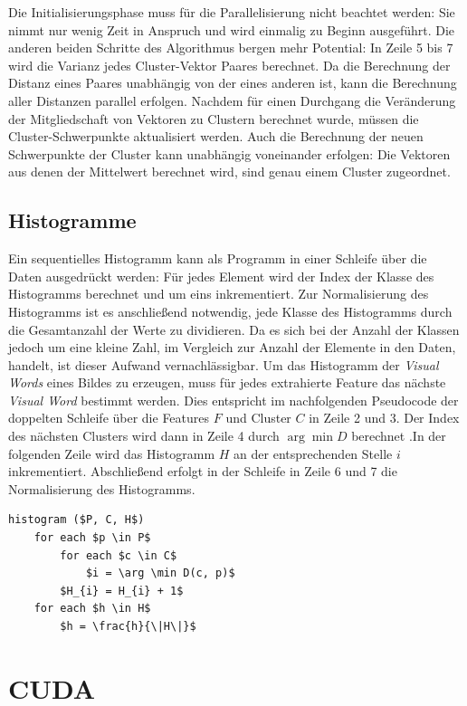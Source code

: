 Die Initialisierungsphase muss für die Parallelisierung nicht beachtet werden: Sie nimmt nur wenig Zeit in Anspruch und wird einmalig zu Beginn ausgeführt. Die anderen beiden Schritte des Algorithmus bergen mehr Potential: In Zeile 5 bis 7 wird die Varianz jedes Cluster-Vektor Paares berechnet. Da die Berechnung der Distanz eines Paares unabhängig von der eines anderen ist, kann die Berechnung aller Distanzen parallel erfolgen. Nachdem für einen Durchgang die Veränderung der Mitgliedschaft von Vektoren zu Clustern berechnet wurde, müssen die Cluster-Schwerpunkte aktualisiert werden. Auch die Berechnung der neuen Schwerpunkte der Cluster kann unabhängig voneinander erfolgen: Die Vektoren aus denen der Mittelwert berechnet wird, sind genau einem Cluster zugeordnet.

\subsection{Histogramme}

Ein sequentielles Histogramm kann als Programm in einer Schleife über die Daten ausgedrückt werden: Für jedes Element wird der Index der Klasse des Histogramms berechnet und um eins inkrementiert. Zur Normalisierung des Histogramms ist es anschließend notwendig, jede Klasse des Histogramms durch die Gesamtanzahl der Werte zu dividieren. Da es sich bei der Anzahl der Klassen jedoch um eine kleine Zahl, im Vergleich zur Anzahl der Elemente in den Daten, handelt, ist dieser Aufwand vernachlässigbar.
Um das Histogramm der \textit{Visual Words} eines Bildes zu erzeugen, muss für jedes extrahierte Feature das nächste \textit{Visual Word} bestimmt werden. Dies entspricht im nachfolgenden Pseudocode der doppelten Schleife über die Features $F$ und Cluster $C$ in Zeile 2 und 3. Der Index des nächsten Clusters wird dann in Zeile 4 durch $\arg \min D$ berechnet .In der folgenden Zeile wird das Histogramm $H$ an der entsprechenden Stelle $i$ inkrementiert. Abschließend erfolgt in der Schleife in Zeile 6 und 7 die Normalisierung des Histogramms.

\begin{lstlisting}[mathescape=true, style=Math]
histogram ($P, C, H$)
	for each $p \in P$
		for each $c \in C$
			$i = \arg \min D(c, p)$ 
		$H_{i} = H_{i} + 1$		
	for each $h \in H$
		$h = \frac{h}{\|H\|}$
\end{lstlisting}

\section{CUDA}

